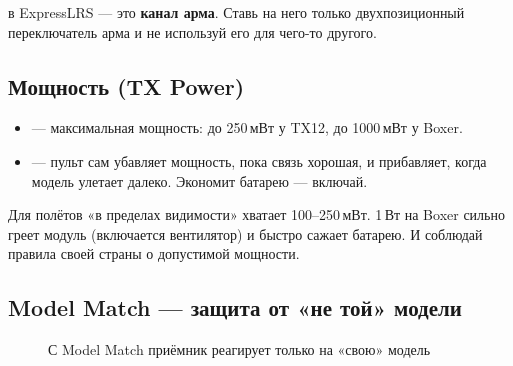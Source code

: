 \begin{caution}
 в ExpressLRS --- это \textbf{канал арма}. Ставь на него только двухпозиционный
переключатель арма и не используй его для чего-то другого.
\end{caution}

\subsection{Мощность (TX Power)}

\begin{itemize}
  \item {} --- максимальная мощность: до 250\,мВт у TX12, до 1000\,мВт у Boxer.
  \item {} --- пульт сам убавляет мощность, пока связь хорошая, и прибавляет, когда
        модель улетает далеко. Экономит батарею --- включай.
\end{itemize}

\begin{tip}
Для полётов «в пределах видимости» хватает 100--250\,мВт. 1\,Вт на Boxer сильно греет модуль
(включается вентилятор) и быстро сажает батарею. И соблюдай правила своей страны
о допустимой мощности.
\end{tip}

\subsection{Model Match --- защита от «не той» модели}

\begin{figure}[H]
\centering
{}
\caption{С Model Match приёмник реагирует только на «свою» модель}
\end{figure}

